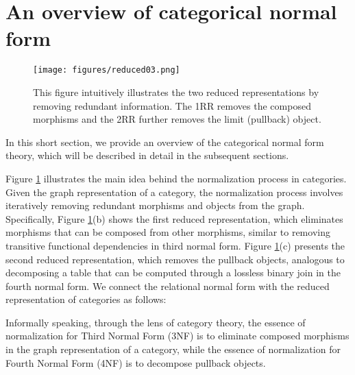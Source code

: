 \section{An overview of categorical normal form}
\label{sec:overview}

\begin{figure}\centering\texttt{[image: figures/reduced03.png]}\caption{This figure intuitively illustrates the two reduced representations by removing redundant information. The 1RR removes the composed morphisms and the 2RR further removes the  limit (pullback) object. }\label{fig:reduced}\end{figure}

In this short section, we provide an overview of the categorical normal form theory, which will be described in detail in the subsequent sections.


Figure \ref{fig:reduced} illustrates the main idea behind the normalization process in categories. Given the graph representation of a category, the normalization process involves iteratively removing redundant morphisms and objects from the graph. Specifically, Figure \ref{fig:reduced}(b) shows the first reduced representation, which eliminates morphisms that can be composed from other morphisms, similar to removing transitive functional dependencies in third normal form. Figure \ref{fig:reduced}(c) presents the second reduced representation, which removes the pullback objects, analogous to decomposing a table that can be computed through a lossless binary join in the fourth normal form. We connect the relational normal form  with the reduced representation of categories as follows:



\begin{tcolorbox}[colback=white,colframe=black,width=\linewidth]  

Informally speaking, through the lens of category theory, the essence of normalization for Third Normal Form (3NF) is to eliminate composed morphisms in the graph representation of a category, while the essence of  normalization for Fourth Normal Form (4NF) is to decompose pullback objects.

\end{tcolorbox}

